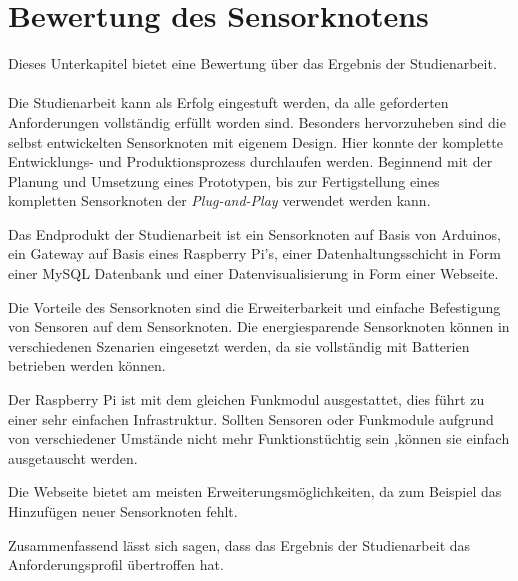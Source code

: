 \section{Bewertung des Sensorknotens}
Dieses Unterkapitel bietet eine Bewertung über das Ergebnis der Studienarbeit.
\paragraph{}
Die Studienarbeit kann als Erfolg eingestuft werden, da alle geforderten Anforderungen vollständig erfüllt worden sind. Besonders hervorzuheben sind die selbst entwickelten Sensorknoten mit  eigenem Design. Hier konnte der komplette Entwicklungs- und Produktionsprozess durchlaufen werden. Beginnend mit der Planung und Umsetzung eines Prototypen, bis zur Fertigstellung eines kompletten Sensorknoten der \textit{Plug-and-Play} verwendet werden kann.

Das Endprodukt der Studienarbeit ist ein Sensorknoten auf Basis von Arduinos, ein Gateway auf Basis eines Raspberry Pi’s, einer Datenhaltungsschicht in Form einer MySQL Datenbank und einer Datenvisualisierung in Form einer Webseite.

Die Vorteile des Sensorknoten sind die Erweiterbarkeit und einfache Befestigung von Sensoren auf dem Sensorknoten. Die energiesparende Sensorknoten können in verschiedenen Szenarien eingesetzt werden, da sie vollständig mit Batterien betrieben werden können. 

Der Raspberry Pi ist mit dem gleichen Funkmodul ausgestattet, dies führt zu einer sehr einfachen Infrastruktur. Sollten Sensoren oder Funkmodule aufgrund von verschiedener Umstände nicht mehr Funktionstüchtig sein ,können sie einfach ausgetauscht werden.

Die Webseite bietet am meisten Erweiterungsmöglichkeiten, da zum Beispiel das Hinzufügen neuer Sensorknoten fehlt.

Zusammenfassend lässt sich sagen, dass das Ergebnis  der Studienarbeit das Anforderungsprofil übertroffen hat. 




